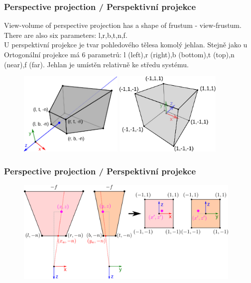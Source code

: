 \begin{frame}
\frametitle{Perspective projection / Perspektivní projekce}
View-volume of perspective projection has a shape of frustum - view-frustum.
There are also six parameters: l,r,b,t,n,f.\\
U perspektivní projekce je tvar pohledového tělesa komolý jehlan.
Stejně jako u Ortogonální projekce má 6 parametrů: l (left),r (right),b (bottom),t (top),n (near),f (far).
Jehlan je umístěn relativně ke středu systému.
\begin{figure}[htb]
	\includegraphics[height=4cm,keepaspectratio]{pics/projection/pers}
	\includegraphics[height=4cm,keepaspectratio]{pics/projection/ndc}
\end{figure}
\end{frame}

\begin{frame}
\frametitle{Perspective projection / Perspektivní projekce}
\begin{figure}[htb]
	\includegraphics[height=5cm,keepaspectratio]{pics/projection/frompers}
\end{figure}
\end{frame}

